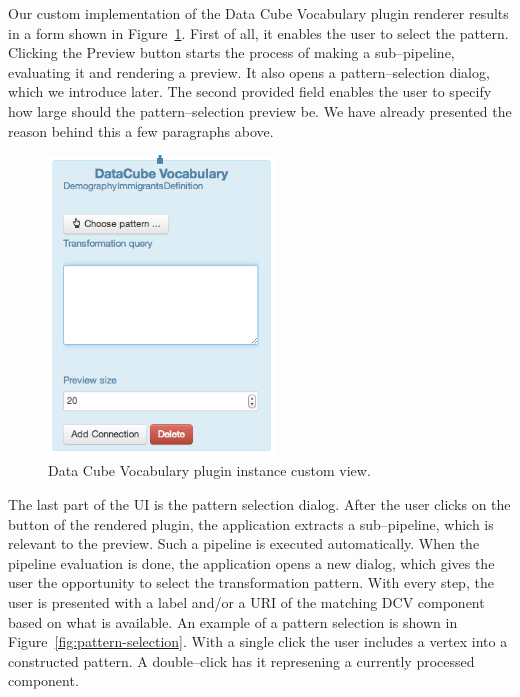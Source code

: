 Our custom implementation of the Data Cube Vocabulary plugin renderer results 
in a form shown in Figure~\ref{fig:DCV-plugin-view}. First of all, it 
enables the user to select the pattern. Clicking the Preview button starts the process of making a
sub--pipeline, evaluating it and rendering a preview. It also opens a pattern--selection
dialog, which we introduce later. The second provided field enables the user to specify how large should 
the pattern--selection preview be. We have already presented the reason behind this 
a few paragraphs above.

\begin{figure}
	\centering
	\includegraphics[width=60mm]{img/custom-dcv-piv.png}
	\caption{Data Cube Vocabulary plugin instance custom view.}
	\label{fig:DCV-plugin-view}
\end{figure}

The last part of the UI is the pattern selection dialog. After the user clicks 
on the button of the rendered plugin, the application extracts a sub--pipeline, 
which is relevant to the preview. Such a pipeline is executed
automatically. When the pipeline evaluation is done, the application opens a new 
dialog, which gives the user the opportunity to select the transformation 
pattern. With every step, the user is presented with a label and/or a URI of the 
matching DCV component based on what is available. An example of a pattern 
selection is shown in Figure~\ref{fig:pattern-selection}. With a single click 
the user includes a vertex into a constructed pattern. A double--click 
has it represening a currently processed component.

